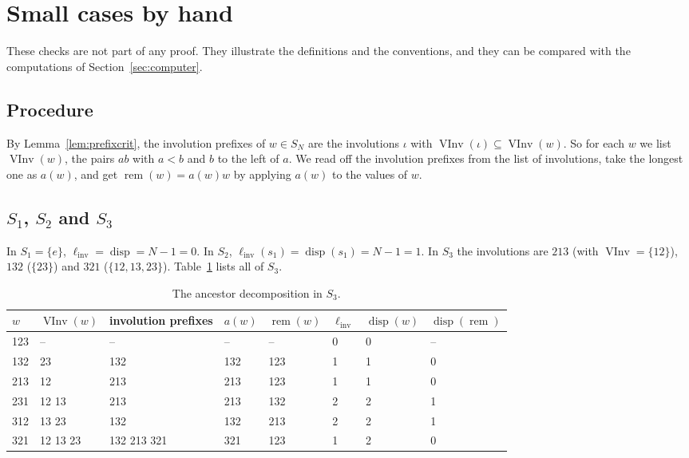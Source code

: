 \documentclass[11pt]{amsart}
\theoremstyle{definition}
\theoremstyle{remark}
\numberwithin{equation}{section}
\newcommand{\linv}{\ell_{\mathrm{inv}}}
\DeclareMathOperator{\rem}{rem}
\DeclareMathOperator{\disp}{disp}
\DeclareMathOperator{\VInv}{VInv}
\begin{document}
\section{Small cases by hand}\label{sec:small}

These checks are not part of any proof. They illustrate the definitions and the conventions, and they can be compared with the computations of Section~\ref{sec:computer}.

\subsection{Procedure}
By Lemma~\ref{lem:prefixcrit}, the involution prefixes of \(w\in S_N\) are the involutions \(\iota\) with \(\VInv(\iota)\subseteq\VInv(w)\). So for each \(w\) we list \(\VInv(w)\), the pairs \(ab\) with \(a<b\) and \(b\) to the left of \(a\). We read off the involution prefixes from the list of involutions, take the longest one as \(a(w)\), and get \(\rem(w)=a(w)w\) by applying \(a(w)\) to the values of \(w\).

\subsection{\texorpdfstring{\(S_1\), \(S_2\) and \(S_3\)}{S1, S2 and S3}}
In \(S_1=\{e\}\), \(\linv=\disp=N-1=0\). In \(S_2\), \(\linv(s_1)=\disp(s_1)=N-1=1\). In \(S_3\) the involutions are \(213\) (with \(\VInv=\{12\}\)), \(132\) (\(\{23\}\)) and \(321\) (\(\{12,13,23\}\)). Table~\ref{tab:S3} lists all of \(S_3\).

\begin{table}[ht]
\centering
\small
\caption{The ancestor decomposition in \(S_3\).}\label{tab:S3}
\begin{tabular}{llllllll}
\toprule
\(w\) & \(\VInv(w)\) & involution prefixes & \(a(w)\) & \(\rem(w)\) & \(\linv\) & \(\disp(w)\) & \(\disp(\rem)\)\\
\midrule
123 & -- & -- & -- & -- & 0 & 0 & --\\
132 & 23 & 132 & 132 & 123 & 1 & 1 & 0\\
213 & 12 & 213 & 213 & 123 & 1 & 1 & 0\\
231 & 12 13 & 213 & 213 & 132 & 2 & 2 & 1\\
312 & 13 23 & 132 & 132 & 213 & 2 & 2 & 1\\
321 & 12 13 23 & 132 213 321 & 321 & 123 & 1 & 2 & 0\\
\bottomrule
\end{tabular}
\end{table}
\end{document}
